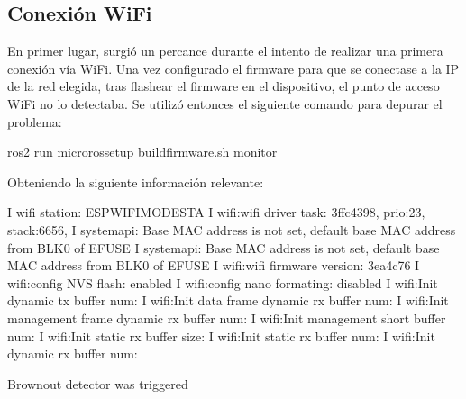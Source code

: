 \documentclass[a4paper,11pt,spanish]{sphinxmanual}
\begin{document}
\subsection{Conexión Wi\sphinxhyphen{}Fi}
\label{\detokenize{Anexos:conexion-wi-fi}}
\sphinxAtStartPar
En primer lugar, surgió un percance durante el intento de realizar
una primera conexión vía Wi\sphinxhyphen{}Fi. Una vez configurado el firmware para
que se conectase a la IP de la red elegida, tras flashear el firmware
en el dispositivo, el punto de acceso Wi\sphinxhyphen{}Fi no lo detectaba. Se utilizó
entonces el siguiente comando para depurar el problema:

\begin{sphinxVerbatim}[commandchars=\\\{\},formatcom=\footnotesize]
ros2 run micro\PYGZus{}ros\PYGZus{}setup build\PYGZus{}firmware.sh monitor
\end{sphinxVerbatim}

\sphinxAtStartPar
Obteniendo la siguiente información relevante:

\begin{sphinxVerbatim}[commandchars=\\\{\},formatcom=\footnotesize]
I  wifi station: ESP\PYGZus{}WIFI\PYGZus{}MODE\PYGZus{}STA
I  wifi:wifi driver task: 3ffc4398, prio:23, stack:6656, 
I  system\PYGZus{}api: Base MAC address is not set,  default base MAC address from BLK0 of EFUSE
I  system\PYGZus{}api: Base MAC address is not set,  default base MAC address from BLK0 of EFUSE
I  wifi:wifi firmware version: 3ea4c76
I  wifi:config NVS flash: enabled
I  wifi:config nano formating: disabled
I  wifi:Init dynamic tx buffer num: 
I  wifi:Init data frame dynamic rx buffer num: 
I  wifi:Init management frame dynamic rx buffer num: 
I  wifi:Init management short buffer num: 
I  wifi:Init static rx buffer size: 
I  wifi:Init static rx buffer num: 
I  wifi:Init dynamic rx buffer num: 

Brownout detector was triggered
\end{sphinxVerbatim}
\end{document}
